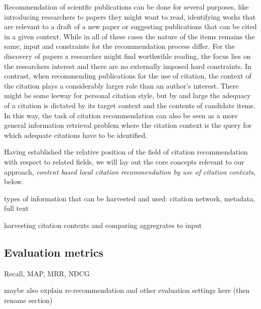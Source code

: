 Recommendation of scientfic publications can be done for several purposes, like introducing researchers to papers they might want to read, identifying works that are relevant to a draft of a new paper or suggesting publications that can be cited in a given context. While in all of these cases the nature of the items remains the same, input and constraints for the recommendation process differ. For the discovery of papers a researcher might find worthwihle reading, the focus lies on the researchers interest and there are no externally imposed hard constraints. In contrast, when recommending publications for the use of citation, the context of the citation plays a considerably larger role than an author's interest. There might be some leeway for personal citation style, but by and large the adequacy of a citation is dictated by its target context and the contents of candidate items. In this way, the task of citation recommendation can also be seen as a more general information retrieval problem where the citation context is the query for which adequate citations have to be identified.

Having established the relative position of the field of citation recommendation with respect to related fields, we will lay out the core concepts relevant to our approach, \emph{content based local citation recommendation by use of citation contexts}, below.

types of information that can be harvested and used: citation network, metadata, full text

harvesting citation contexts and comparing aggregrates to input
\subsection{Evaluation metrics}
Recall, MAP, MRR, NDCG~\cite{Aggarwal2016}

maybe also explain re-recommendation and other evaluation settings here (then rename section)

